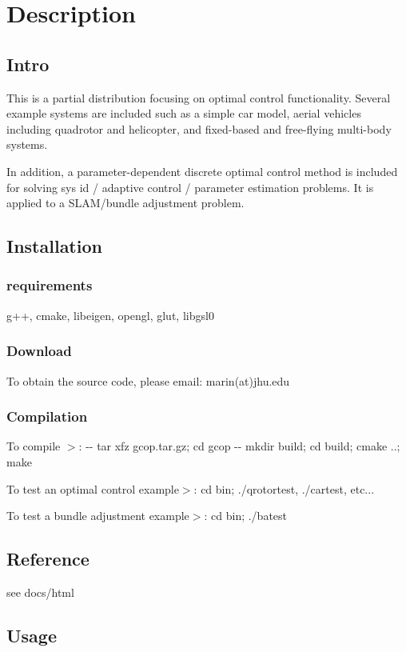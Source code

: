 \section{\-Description}\label{index_Description}
\subsection{\-Intro}\label{index_Intro}
\-This is a partial distribution focusing on optimal control functionality. \-Several example systems are included such as a simple car model, aerial vehicles including quadrotor and helicopter, and fixed-\/based and free-\/flying multi-\/body systems.

\-In addition, a parameter-\/dependent discrete optimal control method is included for solving sys id / adaptive control / parameter estimation problems. \-It is applied to a \-S\-L\-A\-M/bundle adjustment problem.\subsection{\-Installation}\label{index_Installation}
\subsubsection{requirements}\label{index_Build}
g++, cmake, libeigen, opengl, glut, libgsl0\subsubsection{\-Download}\label{index_Download}
\-To obtain the source code, please email\-: marin(at)jhu.\-edu\subsubsection{\-Compilation}\label{index_Compilation}

\begin{DoxyItemize}
\item \-To compile $>$\-: -\/-\/ tar xfz gcop.\-tar.\-gz; cd gcop -\/-\/ mkdir build; cd build; cmake ..; make
\item \-To test an optimal control example$>$\-: cd bin; ./qrotortest, ./cartest, etc...
\item \-To test a bundle adjustment example$>$\-: cd bin; ./batest
\end{DoxyItemize}\subsection{\-Reference}\label{index_API}
see docs/html\subsection{\-Usage}\label{index_Usage}
